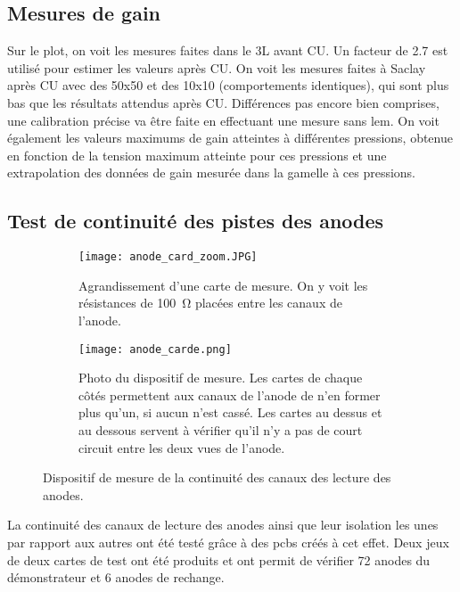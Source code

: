     \subsection{Mesures de gain}\label{sec::test_gain}

      Sur le plot, on voit les mesures faites dans le 3L avant CU. Un facteur de 2.7 est utilisé pour estimer les valeurs après CU. On voit les mesures faites à Saclay après CU avec des 50x50 et des 10x10 (comportements identiques), qui sont plus bas que les résultats attendus après CU. Différences pas encore bien comprises, une calibration précise va être faite en effectuant une mesure sans lem. On voit également les valeurs maximums de gain atteintes à différentes pressions, obtenue en fonction de la tension maximum atteinte pour ces pressions et une extrapolation des données de gain mesurée dans la gamelle à ces pressions.
        
    \subsection{Test de continuité des pistes des anodes}\label{sec::test_anode}

      \begin{figure}
        \begin{subfigure}[t]{0.48\textwidth}
          \texttt{[image: anode\_card\_zoom.JPG]}
          \caption{\label{fig::anode_card_zoom}Agrandissement d'une carte de mesure. On y voit les résistances de \SI{100}{\ohm} placées entre les canaux de l'anode.}
        \end{subfigure}
        \hfill
        \begin{subfigure}[t]{0.48\textwidth}
          \texttt{[image: anode\_carde.png]}
          \caption{\label{fig::anode_card}Photo du dispositif de mesure. Les cartes de chaque côtés permettent aux  canaux de l'anode de n'en former plus qu'un, si aucun n'est cassé. Les cartes au dessus et au dessous servent à vérifier qu'il n'y a pas de court circuit entre les deux vues de l'anode.}
        \end{subfigure}
        \caption[Dispositif de mesure de la continuité des canaux des lecture des anodes.]{\label{fig::test_anode}Dispositif de mesure de la continuité des canaux des lecture des anodes.}
      \end{figure}
      La continuité des canaux de lecture des anodes ainsi que leur isolation les unes par rapport aux autres ont été testé grâce à des \glspl{pcb} créés à cet effet. Deux jeux de deux cartes de test ont été produits et ont permit de vérifier 72 anodes du démonstrateur \SSS{} et 6 anodes de rechange.
      
